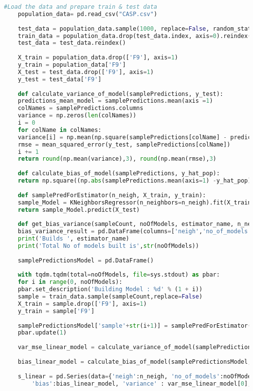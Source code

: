 \documentclass[a4paper]{article}
\begin{document}
\begin{appendices}
\begin{lstlisting}[language=Python]
	#Load the data and prepare train & test data
	population_data= pd.read_csv("CASP.csv")
	
	test_data = population_data.sample(1000, replace=False, random_state=100)
	train_data = population_data.drop(test_data.index, axis=0).reindex()
	test_data = test_data.reindex()
	
	X_train = population_data.drop(['F9'], axis=1)
	y_train = population_data['F9']
	X_test = test_data.drop(['F9'], axis=1)
	y_test = test_data['F9']
	
	def calculate_variance_of_model(samplePredictions, y_test):
	predictions_mean_model = samplePredictions.mean(axis =1)
	colNames = samplePredictions.columns
	variance = np.zeros(len(colNames))
	i = 0
	for colName in colNames:
	variance[i] = np.mean(np.square(samplePredictions[colName] - predictions_mean_model))
	rmse = mean_squared_error(y_test, samplePredictions[colName])
	i += 1
	return round(np.mean(variance),3), round(np.mean(rmse),3)
	
	def calculate_bias_of_model(samplePredictions, y_hat_pop):
	return np.square((np.abs(samplePredictions.mean(axis=1) -y_hat_pop).mean()))
	
	def samplePredForEstimator(n_neigh, X_train, y_train):
	sample_Model = KNeighborsRegressor(n_neighbors=n_neigh).fit(X_train, y_train)
	return sample_Model.predict(X_test)
	
	def get_bias_variance(sampleCount, noOfModels, estimator_name, n_neigh):
	bias_variance_result = pd.DataFrame(columns=['neigh','no_of_models','algorithm','bias','variance', 'mse'])
	print('Builds ', estimator_name)
	print('Total No of models built is',str(noOfModels))
	
	samplePredictionsModel = pd.DataFrame()
	
	with tqdm.tqdm(total=noOfModels, file=sys.stdout) as pbar:
	for i in range(0, noOfModels):
	pbar.set_description('Building Model : %d' % (1 + i))
	sample = train_data.sample(sampleCount,replace=False)
	X_train = sample.drop(['F9'], axis=1)
	y_train = sample['F9']
	
	samplePredictionsModel['sample'+str(i+1)] = samplePredForEstimator(n_neigh, X_train, y_train)
	pbar.update(1)
	
	var_mse_linear_model = calculate_variance_of_model(samplePredictionsModel, y_test)
	
	bias_linear_model = calculate_bias_of_model(samplePredictionsModel, y_test)
	
	s_linear = pd.Series(data={'neigh':n_neigh, 'no_of_models':noOfModels, 'algorithm':'KNN',
		'bias':bias_linear_model, 'variance' : var_mse_linear_model[0], 'mse' : var_mse_linear_model[1]}, name = 0)
	

\end{lstlisting}
\end{appendices}
\end{document}
